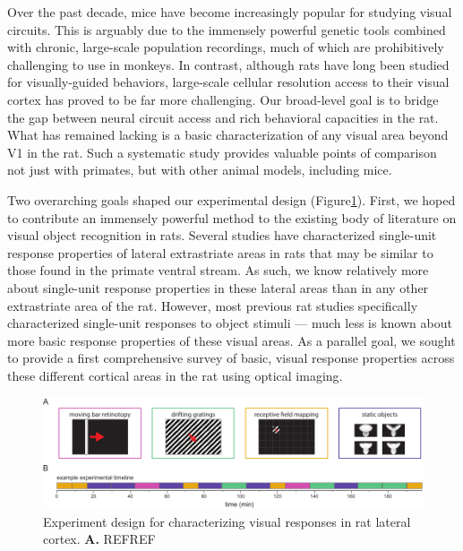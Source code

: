 Over the past decade, mice have become increasingly popular for studying visual circuits. This is arguably due to the immensely powerful genetic tools combined with chronic, large-scale population recordings, much of which are prohibitively challenging to use in monkeys. In contrast, although rats have long been studied for visually-guided behaviors, large-scale cellular resolution access to their visual cortex has proved to be far more challenging. Our broad-level goal is to bridge the gap between neural circuit access and rich behavioral capacities in the rat. What has remained lacking is a basic characterization of any visual area beyond V1 in the rat. Such a systematic study provides valuable points of comparison not just with primates, but with other animal models, including mice. 

Two overarching goals shaped our experimental design (Figure\ref{fig:experiment_design}). First, we hoped to contribute an immensely powerful method to the existing body of literature on visual object recognition in rats. Several studies have characterized single-unit response properties of lateral extrastriate areas in rats that may be similar to those found in the primate ventral stream\cite{Tafazoli2017, Vermaercke2014, VinkenX, Vermaerke2015}. As such, we know relatively more about single-unit response properties in these lateral areas than in any other extrastriate area of the rat. However, most previous rat studies specifically characterized single-unit responses to object stimuli --- much less is known about more basic response properties of these visual areas. As a parallel goal, we sought to provide a first comprehensive survey of basic, visual response properties across these different cortical areas in the rat using optical imaging. 

\begin{figure}
    \includegraphics[width=\textwidth]{figures/chapter_3/fig_3-0_experiment_design/fig_3-0_experiment_design.pdf}
    \vspace{.1in}
    \caption[Experiment design]{Experiment design for characterizing visual responses in rat lateral cortex. \textbf{A.} REFREF 
    \label{fig:experiment_design}}
\end{figure}

